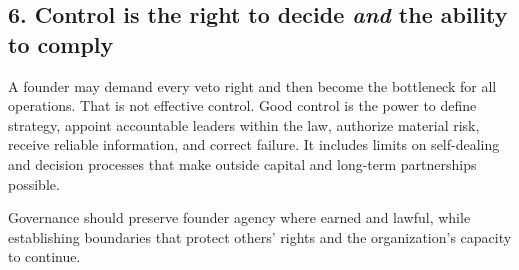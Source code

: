 \subsection{6. Control is the right to decide \textit{and} the ability to comply}

A founder may demand every veto right and then become the bottleneck for all operations. That is not effective control. Good control is the power to define strategy, appoint accountable leaders within the law, authorize material risk, receive reliable information, and correct failure. It includes limits on self-dealing and decision processes that make outside capital and long-term partnerships possible.

Governance should preserve founder agency where earned and lawful, while establishing boundaries that protect others' rights and the organization's capacity to continue.
